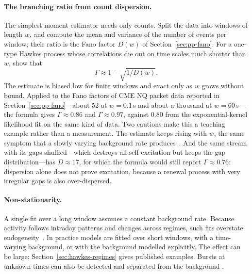 \paragraph{The branching ratio from count dispersion.} The simplest moment estimator needs only
counts. Split the data into windows of length $w$, and compute the mean and variance of the number of
events per window; their ratio is the Fano factor $D(w)$ of Section~\ref{sec:pp-fano}. For a
one-type Hawkes process whose correlations die out on time scales much shorter than $w$,
\citet{hardiman2014branching} show that
\begin{equation}
  \Gamma \approx 1 - \sqrt{1/D(w)} .
\end{equation}
The estimate is biased low for finite windows and exact only as $w$ grows without bound. Applied to the Fano factors of CME NQ
packet data reported in Section~\ref{sec:pp-fano}---about 52 at $w = 0.1$\,s and about a thousand at
$w = 60$\,s---the formula gives $\Gamma \approx 0.86$ and $\Gamma \approx 0.97$, against $0.80$ from
the exponential-kernel likelihood fit on the same kind of data. Two cautions make this a teaching
example rather than a measurement. The estimate keeps rising with $w$, the same symptom that a slowly
varying background rate produces~\citep{filimonovsornette2015}. And the same stream with its gaps
shuffled---which destroys all self-excitation but keeps the gap distribution---has $D \approx 17$, for
which the formula would still report $\Gamma \approx 0.76$: dispersion alone does not prove
excitation, because a renewal process with very irregular gaps is also over-dispersed.

\paragraph{Non-stationarity.} A single fit over a long window assumes a constant background rate.
Because activity follows intraday patterns and changes across regimes, such fits overstate
endogeneity~\citep{filimonovsornette2015}. In practice models are fitted over short windows, with a
time-varying background, or with the background modelled explicitly. The effect can be large;
Section~\ref{sec:hawkes-regimes} gives published examples. Bursts at unknown times can also be detected and separated from the background
\citep{rambaldi2018bursts}.

